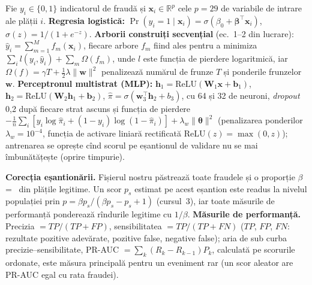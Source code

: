{Fie $y_i\in\{0,1\}$ indicatorul de fraudă și $\mathbf x_i\in\mathbb R^{p}$ cele $p=29$ de variabile de intrare ale plății $i$.
\textbf{Regresia logistică:} $\Pr(y_i=1\mid\mathbf x_i)=\sigma(\beta_0+\boldsymbol\beta^\top\mathbf x_i)$, $\sigma(z)=1/(1+e^{-z})$.
\textbf{Arborii construiți secvențial} (ec.~1--2 din lucrare): $\hat y_i=\sum_{m=1}^{M}f_m(\mathbf x_i)$, fiecare arbore $f_m$ fiind ales pentru a minimiza $\sum_i l(y_i,\hat y_i)+\sum_m\Omega(f_m)$, unde $l$ este funcția de pierdere logaritmică, iar $\Omega(f)=\gamma T+\tfrac12\lambda\lVert\mathbf w\rVert^2$ penalizează numărul de frunze $T$ și ponderile frunzelor $\mathbf w$.
\textbf{Perceptronul multistrat (MLP):} $\mathbf h_1=\mathrm{ReLU}(\mathbf W_1\mathbf x+\mathbf b_1)$, $\mathbf h_2=\mathrm{ReLU}(\mathbf W_2\mathbf h_1+\mathbf b_2)$, $\hat\pi=\sigma(\mathbf w_3^\top\mathbf h_2+b_3)$, cu 64 și 32 de neuroni, \emph{dropout} 0,2 după fiecare strat ascuns și funcția de pierdere $-\frac1n\sum_i[y_i\log\hat\pi_i+(1-y_i)\log(1-\hat\pi_i)]+\lambda_w\lVert\boldsymbol\theta\rVert^2$ (penalizarea ponderilor $\lambda_w=10^{-4}$, funcția de activare liniară rectificată ReLU$(z)=\max(0,z)$); antrenarea se oprește cînd scorul pe eșantionul de validare nu se mai îmbunătățește (oprire timpurie).}

%
{\textbf{Corecția eșantionării.} Fișierul nostru păstrează toate fraudele și o proporție $\beta$ = \Nbeta\ din plățile legitime. Un scor $p_s$ estimat pe acest eșantion este readus la nivelul populației prin $p=\beta p_s/(\beta p_s-p_s+1)$ (cursul~3), iar toate măsurile de performanță ponderează rîndurile legitime cu $1/\beta$.
\textbf{Măsurile de performanță.} Precizia $=TP/(TP+FP)$, sensibilitatea $=TP/(TP+FN)$ ($TP$, $FP$, $FN$: rezultate pozitive adevărate, pozitive false, negative false); aria de sub curba precizie--sensibilitate, PR-AUC $=\sum_k(R_k-R_{k-1})P_k$, calculată pe scorurile ordonate, este măsura principală pentru un eveniment rar (un scor aleator are PR-AUC egal cu rata fraudei).}

